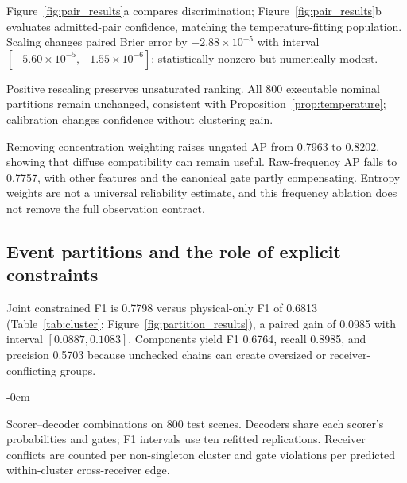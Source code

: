 Figure~\ref{fig:pair_results}a compares discrimination; Figure~\ref{fig:pair_results}b evaluates admitted-pair confidence, matching the temperature-fitting population. Scaling changes paired Brier error by $-2.88\times10^{-5}$ with interval $[-5.60\times10^{-5},-1.55\times10^{-6}]$: statistically nonzero but numerically modest.

Positive rescaling preserves unsaturated ranking. All 800 executable nominal partitions remain unchanged, consistent with Proposition~\ref{prop:temperature}; calibration changes confidence without clustering gain.

Removing concentration weighting raises ungated AP from 0.7963 to 0.8202, showing that diffuse compatibility can remain useful. Raw-frequency AP falls to 0.7757, with other features and the canonical gate partly compensating. Entropy weights are not a universal reliability estimate, and this frequency ablation does not remove the full observation contract.

\subsection{Event partitions and the role of explicit constraints}
Joint constrained F1 is 0.7798 versus physical-only F1 of 0.6813 (Table~\ref{tab:cluster}; Figure~\ref{fig:partition_results}), a paired gain of 0.0985 with interval $[0.0887,0.1083]$. Components yield F1 0.6764, recall 0.8985, and precision 0.5703 because unchecked chains can create oversized or receiver-conflicting groups.

\begin{table}[!t]\begin{adjustwidth}{-\extralength}{0cm}
\caption{Scorer--decoder combinations on 800 test scenes. Decoders share each scorer's probabilities and gates; F1 intervals use ten refitted replications. Receiver conflicts are counted per non-singleton cluster and gate violations per predicted within-cluster cross-receiver edge.}\label{tab:cluster}
\small\renewcommand{\arraystretch}{1.10}
\end{adjustwidth}\end{table}


